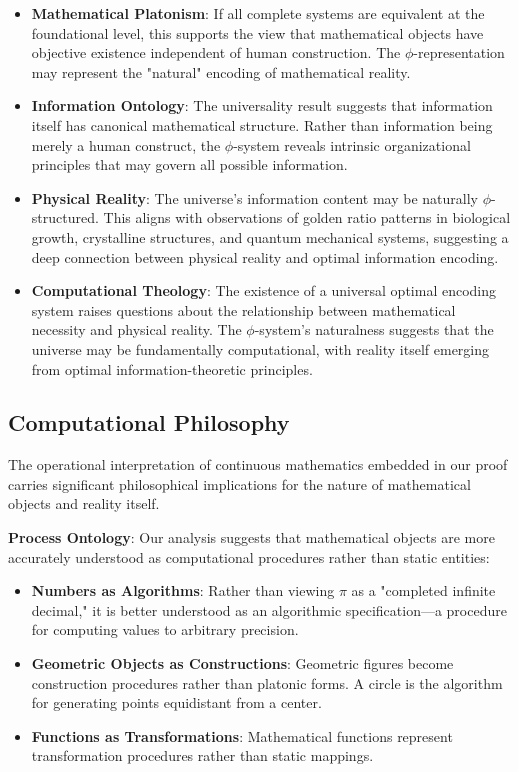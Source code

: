 \documentclass[12pt,letterpaper]{article}
\begin{document}
\begin{itemize}
\item \textbf{Mathematical Platonism}: If all complete systems are equivalent at the foundational level, this supports the view that mathematical objects have objective existence independent of human construction. The $\phi$-representation may represent the "natural" encoding of mathematical reality.

\item \textbf{Information Ontology}: The universality result suggests that information itself has canonical mathematical structure. Rather than information being merely a human construct, the $\phi$-system reveals intrinsic organizational principles that may govern all possible information.

\item \textbf{Physical Reality}: The universe's information content may be naturally $\phi$-structured. This aligns with observations of golden ratio patterns in biological growth, crystalline structures, and quantum mechanical systems, suggesting a deep connection between physical reality and optimal information encoding.

\item \textbf{Computational Theology}: The existence of a universal optimal encoding system raises questions about the relationship between mathematical necessity and physical reality. The $\phi$-system's naturalness suggests that the universe may be fundamentally computational, with reality itself emerging from optimal information-theoretic principles.
\end{itemize}

\subsection{Computational Philosophy}

The operational interpretation of continuous mathematics embedded in our proof carries significant philosophical implications for the nature of mathematical objects and reality itself.

\textbf{Process Ontology}: Our analysis suggests that mathematical objects are more accurately understood as computational procedures rather than static entities:

\begin{itemize}
\item \textbf{Numbers as Algorithms}: Rather than viewing $\pi$ as a "completed infinite decimal," it is better understood as an algorithmic specification—a procedure for computing values to arbitrary precision.

\item \textbf{Geometric Objects as Constructions}: Geometric figures become construction procedures rather than platonic forms. A circle is the algorithm for generating points equidistant from a center.

\item \textbf{Functions as Transformations}: Mathematical functions represent transformation procedures rather than static mappings.
\end{itemize}
\end{document}
